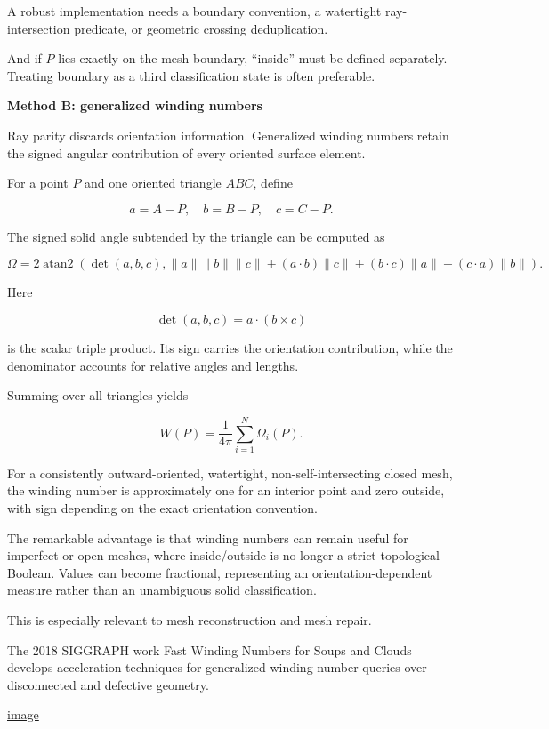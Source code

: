 A robust implementation needs a boundary convention, a watertight ray-intersection predicate, or geometric crossing deduplication.

And if \(P\) lies exactly on the mesh boundary, ``inside'' must be defined separately. Treating boundary as a third classification state is often preferable.

\textbf{Method B: generalized winding numbers}

Ray parity discards orientation information. Generalized winding numbers retain the signed angular contribution of every oriented surface element.

For a point \(P\) and one oriented triangle \(ABC\), define

\[
a=A-P,\quad b=B-P,\quad c=C-P.
\]

The signed solid angle subtended by the triangle can be computed as

\[
\Omega= 2\operatorname{atan2} \left( \det(a,b,c), \|a\|\|b\|\|c\| +(a\cdot b)\|c\| +(b\cdot c)\|a\| +(c\cdot a)\|b\| \right).
\]

Here

\[
\det(a,b,c)=a\cdot(b\times c)
\]

is the scalar triple product. Its sign carries the orientation contribution, while the denominator accounts for relative angles and lengths.

Summing over all triangles yields

\[
W(P)=\frac{1}{4\pi}\sum_{i=1}^{N}\Omega_i(P).
\]

For a consistently outward-oriented, watertight, non-self-intersecting closed mesh, the winding number is approximately one for an interior point and zero outside, with sign depending on the exact orientation convention.

The remarkable advantage is that winding numbers can remain useful for imperfect or open meshes, where inside/outside is no longer a strict topological Boolean. Values can become fractional, representing an orientation-dependent measure rather than an unambiguous solid classification.

This is especially relevant to mesh reconstruction and mesh repair.

The 2018 SIGGRAPH work Fast Winding Numbers for Soups and Clouds develops acceleration techniques for generalized winding-number queries over disconnected and defective geometry. 

\href{https://www.google.com/s2/favicons?domain=https://doi.org&sz=32}{image}

